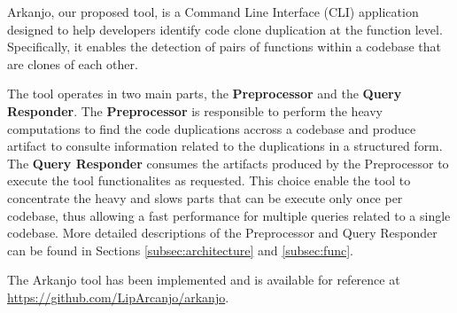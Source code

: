 \en

Arkanjo, our proposed tool, is a Command Line Interface (CLI) application designed to
help developers identify code clone duplication at the function level.
Specifically, it enables the detection of pairs of functions within a codebase
that are clones of each other.

The tool operates in two main parts, the \textbf{Preprocessor} and the \textbf{Query Responder}. 
The \textbf{Preprocessor} is responsible to perform the heavy computations to find the code duplications 
accross a codebase and produce artifact to consulte information related to the duplications in a structured form.
The \textbf{Query Responder} consumes the artifacts produced by the Preprocessor to execute the tool functionalites as requested.
This choice enable the tool to concentrate the heavy and slows parts that can be execute only once per codebase, 
thus allowing a fast performance for multiple queries related to a single codebase.
More detailed descriptions of the Preprocessor and Query Responder can be found in
Sections \ref{subsec:architecture} and \ref{subsec:func}.

The Arkanjo tool has been implemented and is available for reference at
\url{https://github.com/LipArcanjo/arkanjo}.






